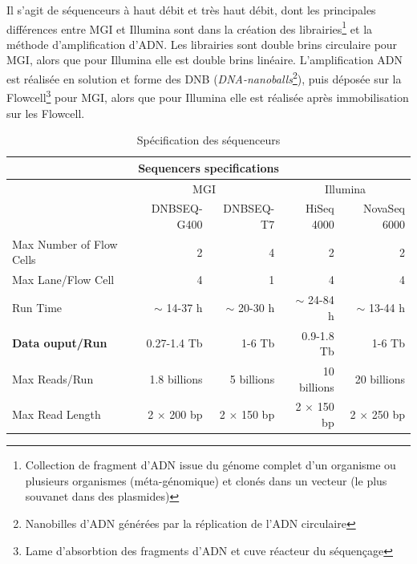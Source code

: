     Il s'agit de séquenceurs à haut débit et très haut débit, dont les principales différences entre MGI et Illumina sont dans la création des librairies\footnote{Collection de fragment d'ADN issue du génome complet d'un organisme ou plusieurs organismes (méta-génomique) et clonés dans un vecteur (le plus souvanet dans des plasmides)} et la méthode d'amplification d'ADN. Les librairies sont double brins circulaire pour MGI, alors que pour Illumina elle est double brins linéaire. L'amplification ADN est réalisée en solution et forme des DNB (\emph{DNA-nanoballs}\footnote{Nanobilles d'ADN générées par la réplication de l'ADN circulaire}), puis déposée sur la Flowcell\footnote{Lame d'absorbtion des fragments d'ADN et cuve réacteur du séquençage} pour MGI, alors que pour Illumina elle est réalisée après immobilisation sur les Flowcell.

\begin{table}[H]
\begin{tabular}{ |p{5cm}||r|r|r|r| }
    \hline
    \multicolumn{5}{|c|}{Sequencers specifications} \\\hline
    & \multicolumn{2}{|c|}{MGI} & \multicolumn{2}{|c|}{Illumina}\\\hline
    & \footnotesize{DNBSEQ-G400} & \footnotesize{DNBSEQ-T7} & \footnotesize{HiSeq 4000} & \footnotesize{NovaSeq 6000} \\\hline\hline
    Max Number of Flow Cells & 2 & 4 & 2 & 2 \\\hline
    Max Lane/Flow Cell & 4 & 1 & 4 & 4 \\\hline
    Run Time & $\sim$ 14-37 h & $\sim$ 20-30 h & $\sim$ 24-84 h & $\sim$ 13-44 h \\\hline
    \textbf{Data ouput/Run} & 0.27-1.4 Tb & 1-6 Tb & 0.9-1.8 Tb & 1-6 Tb \\\hline
    Max Reads/Run & 1.8 billions & 5 billions & 10 billions & 20 billions \\\hline
    Max Read Length & 2 $\times$ 200 bp & 2 $\times$ 150 bp & 2 $\times$ 150 bp & 2 $\times$ 250 bp \\\hline
\end{tabular}
    \caption{Spécification des séquenceurs}
    \label{spe-seq}
\end{table}

